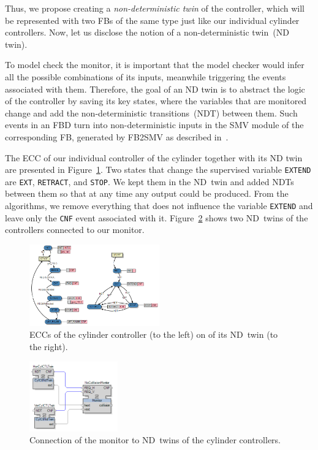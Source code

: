 \begin{bibunit}
Thus, we propose creating a \emph{non-deterministic twin} of the controller, which will be represented with two FBs of the same type just like our individual cylinder controllers. Now, let us disclose the notion of a non-deterministic twin~(ND twin). 

To model check the monitor, it is important that the model checker would infer all the possible combinations of its inputs, meanwhile triggering the events associated with them. Therefore, the goal of an ND twin is to abstract the logic of the controller by saving its key states, where the variables that are monitored change and add the non-deterministic transitions~(NDT) between them. Such events in an FBD turn into non-deterministic inputs in the SMV module of the corresponding FB, generated by FB2SMV as described in~\cite{agn_case_study}. 

The ECC of our individual controller of the cylinder together with its ND twin are presented in Figure~\ref{fig:ndtwinecc}. Two states that change the supervised variable \texttt{EXTEND} are \texttt{EXT}, \texttt{RETRACT}, and \texttt{STOP}. We kept them in the ND~twin and added NDTs between them so that at any time any output could be produced. From the algorithms, we remove everything that does not influence the variable \texttt{EXTEND} and leave only the \texttt{CNF} event associated with it. Figure~\ref{fig:ndtwinloop} shows two ND~twins of the controllers connected to our monitor.

\begin{figure}[t]
    \centering
    \includegraphics[width=0.5\textwidth]{MX_Papers/Paper3/pic/ndtcontrollereccs.png}
    \caption{ECCs of the cylinder controller (to the left) on of its ND~twin (to the right).}
    \label{fig:ndtwinecc}
\end{figure}


\begin{figure}[b]
    \centering
    \includegraphics[width=0.34\textwidth]{MX_Papers/Paper3/pic/ndtwinloop.png}
    \caption{Connection of the monitor to ND~twins of the cylinder controllers.}
    \label{fig:ndtwinloop}
\end{figure}


\end{bibunit}
